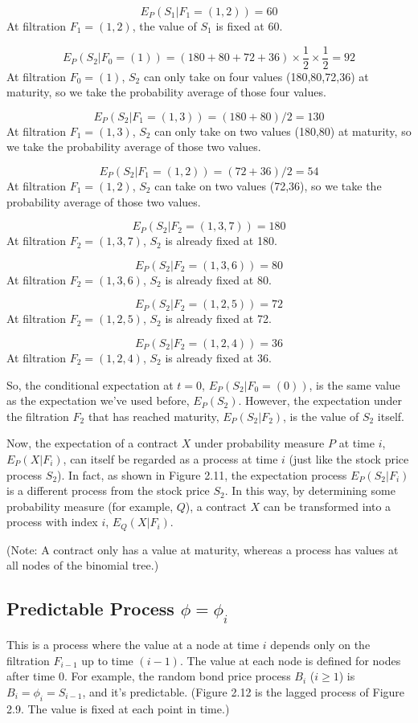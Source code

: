 \documentclass[uplatex,a4j,12pt,dvipdfmx]{jsarticle}
\begin{document}
\[E_P( S_1 | F_1=(1,2) ) = 60\]
At filtration $F_1 = (1,2)$, the value of $S_1$ is fixed at 60.

\[E_P( S_2 | F_0=(1) ) = (180+80+72+36) \times \frac{1}{2} \times \frac{1}{2} = 92\]
At filtration $F_0 = (1)$, $S_2$ can only take on four values (180,80,72,36) at maturity, so we take the probability average of those four values.

\[E_P( S_2 | F_1=(1,3) ) = (180+80)/2 = 130\]
At filtration $F_1 = (1,3)$, $S_2$ can only take on two values (180,80) at maturity, so we take the probability average of those two values.

\[E_P( S_2 | F_1=(1,2) ) = (72+36)/2 = 54\]
At filtration $F_1 = (1,2)$, $S_2$ can take on two values (72,36), so we take the probability average of those two values.

\[E_P( S_2 | F_2=(1,3,7) ) = 180\]
At filtration $F_2 = (1,3,7)$, $S_2$ is already fixed at 180.

\[E_P( S_2 | F_2=(1,3,6) ) = 80\]
At filtration $F_2 = (1,3,6)$, $S_2$ is already fixed at 80.

\[E_P( S_2 | F_2=(1,2,5) ) = 72\]
At filtration $F_2 = (1,2,5)$, $S_2$ is already fixed at 72.

\[E_P( S_2 | F_2=(1,2,4) ) = 36\]
At filtration $F_2 = (1,2,4)$, $S_2$ is already fixed at 36.

So, the conditional expectation at $t=0$, $E_{P}(S_{2}|F_{0}=(0))$, is the same value as the expectation we've used before, $E_P(S_2)$. However, the expectation under the filtration $F_2$ that has reached maturity, $E_P(S_2|F_2)$, is the value of $S_2$ itself.

Now, the expectation of a contract $X$ under probability measure $P$ at time $i$, $E_P(X|F_i)$, can itself be regarded as a process at time $i$ (just like the stock price process $S_2$). In fact, as shown in Figure 2.11, the expectation process $E_P(S_2|F_i)$ is a different process from the stock price $S_2$. In this way, by determining some probability measure (for example, $Q$), a contract $X$ can be transformed into a process with index $i$, $E_Q(X|F_i)$.

(Note: A contract only has a value at maturity, whereas a process has values at all nodes of the binomial tree.)

\subsection{Predictable Process $\phi=\phi_{i}$}
This is a process where the value at a node at time $i$ depends only on the filtration $F_{i-1}$ up to time $(i-1)$. The value at each node is defined for nodes after time 0. For example, the random bond price process $B_i$ ($i \ge 1$) is $B_i = \phi_i = S_{i-1}$, and it's predictable. (Figure 2.12 is the lagged process of Figure 2.9. The value is fixed at each point in time.)
\end{document}
